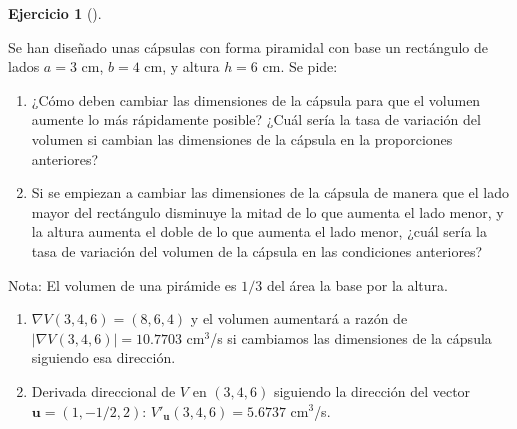 \documentclass[
  a4paper,
]{scrreport}
\providecommand{\tightlist}{%
  \setlength{\itemsep}{0pt}\setlength{\parskip}{0pt}}\usepackage{longtable,booktabs,array}
\theoremstyle{definition}
\newtheorem{exercise}{Ejercicio}[chapter]
\theoremstyle{remark}
\begin{document}
\begin{exercise}[]\protect\hypertarget{exr-3}{}\label{exr-3}

Se han diseñado unas cápsulas con forma piramidal con base un rectángulo
de lados \(a=3\) cm, \(b=4\) cm, y altura \(h=6\) cm. Se pide:

\begin{enumerate}
\def\labelenumi{\arabic{enumi}.}
\tightlist
\item
  ¿Cómo deben cambiar las dimensiones de la cápsula para que el volumen
  aumente lo más rápidamente posible? ¿Cuál sería la tasa de variación
  del volumen si cambian las dimensiones de la cápsula en la
  proporciones anteriores?
\item
  Si se empiezan a cambiar las dimensiones de la cápsula de manera que
  el lado mayor del rectángulo disminuye la mitad de lo que aumenta el
  lado menor, y la altura aumenta el doble de lo que aumenta el lado
  menor, ¿cuál sería la tasa de variación del volumen de la cápsula en
  las condiciones anteriores?
\end{enumerate}

Nota: El volumen de una pirámide es \(1/3\) del área la base por la
altura.

\end{exercise}

\begin{tcolorbox}[enhanced jigsaw, opacitybacktitle=0.6, titlerule=0mm, bottomtitle=1mm, toptitle=1mm, breakable, bottomrule=.15mm, left=2mm, opacityback=0, toprule=.15mm, leftrule=.75mm, colframe=quarto-callout-tip-color-frame, coltitle=black, rightrule=.15mm, colback=white, title=\textcolor{quarto-callout-tip-color}{\faLightbulb}\hspace{0.5em}{Solución}, arc=.35mm, colbacktitle=quarto-callout-tip-color!10!white]

\begin{enumerate}
\def\labelenumi{\arabic{enumi}.}
\tightlist
\item
  \(\nabla V(3,4,6)=(8,6,4)\) y el volumen aumentará a razón de
  \(|\nabla V(3,4,6)|=10.7703\) cm\(^3\)/s si cambiamos las dimensiones
  de la cápsula siguiendo esa dirección.
\item
  Derivada direccional de \(V\) en \((3,4,6)\) siguiendo la dirección
  del vector \(\mathbf{u}=(1,-1/2,2)\):
  \(V'_{\mathbf{u}}(3,4,6)=5.6737\) cm\(^3\)/s.
\end{enumerate}

\end{tcolorbox}
\end{document}
